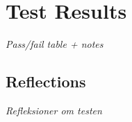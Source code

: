 \section{Test Results}
\textit{Pass/fail table + notes}

\subsection{Reflections}
\textit{Refleksioner om testen}